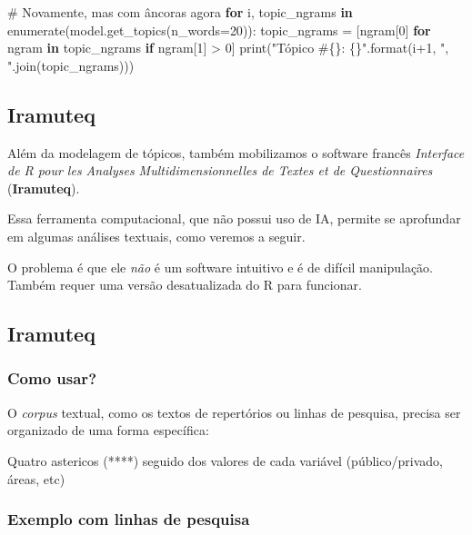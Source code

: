 \documentclass[
  brazilian,
  letterpaper,
  DIV=11,
  numbers=noendperiod]{scrartcl}
\newenvironment{Shaded}{\begin{snugshade}}{\end{snugshade}}
\newcommand{\BuiltInTok}[1]{\textcolor[rgb]{0.00,0.23,0.31}{#1}}
\newcommand{\CommentTok}[1]{\textcolor[rgb]{0.37,0.37,0.37}{#1}}
\newcommand{\ControlFlowTok}[1]{\textcolor[rgb]{0.00,0.23,0.31}{\textbf{#1}}}
\newcommand{\DecValTok}[1]{\textcolor[rgb]{0.68,0.00,0.00}{#1}}
\newcommand{\KeywordTok}[1]{\textcolor[rgb]{0.00,0.23,0.31}{\textbf{#1}}}
\newcommand{\NormalTok}[1]{\textcolor[rgb]{0.00,0.23,0.31}{#1}}
\newcommand{\OperatorTok}[1]{\textcolor[rgb]{0.37,0.37,0.37}{#1}}
\newcommand{\SpecialCharTok}[1]{\textcolor[rgb]{0.37,0.37,0.37}{#1}}
\newcommand{\StringTok}[1]{\textcolor[rgb]{0.13,0.47,0.30}{#1}}
\begin{document}
\begin{Shaded}
\begin{Highlighting}[]
\CommentTok{\# Novamente, mas com âncoras agora}
\ControlFlowTok{for}\NormalTok{ i, topic\_ngrams }\KeywordTok{in} \BuiltInTok{enumerate}\NormalTok{(model.get\_topics(n\_words}\OperatorTok{=}\DecValTok{20}\NormalTok{)):}
\NormalTok{    topic\_ngrams }\OperatorTok{=}\NormalTok{ [ngram[}\DecValTok{0}\NormalTok{] }\ControlFlowTok{for}\NormalTok{ ngram }\KeywordTok{in}\NormalTok{ topic\_ngrams }\ControlFlowTok{if}\NormalTok{ ngram[}\DecValTok{1}\NormalTok{] }\OperatorTok{\textgreater{}} \DecValTok{0}\NormalTok{]}
    \BuiltInTok{print}\NormalTok{(}\StringTok{"Tópico \#}\SpecialCharTok{\{\}}\StringTok{: }\SpecialCharTok{\{\}}\StringTok{"}\NormalTok{.}\BuiltInTok{format}\NormalTok{(i}\OperatorTok{+}\DecValTok{1}\NormalTok{, }\StringTok{", "}\NormalTok{.join(topic\_ngrams)))}
\end{Highlighting}
\end{Shaded}

\subsection{Iramuteq}\label{iramuteq}

Além da modelagem de tópicos, também mobilizamos o software francês
\emph{Interface de R pour les Analyses Multidimensionnelles de Textes et
de Questionnaires} (\textbf{Iramuteq}).

Essa ferramenta computacional, que não possui uso de IA, permite se
aprofundar em algumas análises textuais, como veremos a seguir.

O problema é que ele \emph{não} é um software intuitivo e é de difícil
manipulação. Também requer uma versão desatualizada do R para funcionar.

\subsection{Iramuteq}\label{iramuteq-1}

\subsubsection{Como usar?}

O \emph{corpus} textual, como os textos de repertórios ou linhas de
pesquisa, precisa ser organizado de uma forma específica:

Quatro astericos (****) seguido dos valores de cada variável
(público/privado, áreas, etc)

\subsubsection{Exemplo com linhas de pesquisa}
\end{document}
